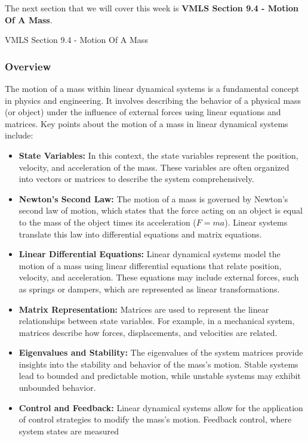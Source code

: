 The next section that we will cover this week is \textbf{VMLS Section 9.4 - Motion Of A Mass}.

\begin{notes}{VMLS Section 9.4 - Motion Of A Mass}
    \subsubsection*{Overview}

    The motion of a mass within linear dynamical systems is a fundamental concept in physics and engineering. It involves describing the behavior of a physical mass (or object) under the influence of 
    external forces using linear equations and matrices. Key points about the motion of a mass in linear dynamical systems include:
    
    \begin{itemize}
        \item \textbf{State Variables:} In this context, the state variables represent the position, velocity, and acceleration of the mass. These variables are often organized into vectors or matrices 
        to describe the system comprehensively.
        \item \textbf{Newton's Second Law:} The motion of a mass is governed by Newton's second law of motion, which states that the force acting on an object is equal to the mass of the object times 
        its acceleration (\(F = ma\)). Linear systems translate this law into differential equations and matrix equations.
        \item \textbf{Linear Differential Equations:} Linear dynamical systems model the motion of a mass using linear differential equations that relate position, velocity, and acceleration. These 
        equations may include external forces, such as springs or dampers, which are represented as linear transformations.
        \item \textbf{Matrix Representation:} Matrices are used to represent the linear relationships between state variables. For example, in a mechanical system, matrices describe how forces, 
        displacements, and velocities are related.
        \item \textbf{Eigenvalues and Stability:} The eigenvalues of the system matrices provide insights into the stability and behavior of the mass's motion. Stable systems lead to bounded and 
        predictable motion, while unstable systems may exhibit unbounded behavior.
        \item \textbf{Control and Feedback:} Linear dynamical systems allow for the application of control strategies to modify the mass's motion. Feedback control, where system states are measured 

\end{itemize}
\end{notes}

